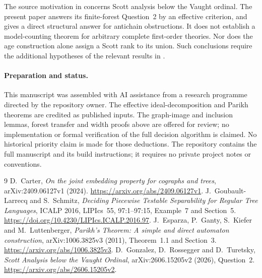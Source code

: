\documentclass[11pt]{article}
\begin{document}
The source motivation in \cite{GRT} concerns Scott analysis below the
Vaught ordinal. The present paper answers its finite-forest Question~2
by an effective criterion, and gives a direct structural answer for
antichain obstructions. It does not establish a model-counting theorem
for arbitrary complete first-order theories. Nor does the age
construction alone assign a Scott rank to its union. Such conclusions
require the additional hypotheses of the relevant results in
\cite{GRT}.

\paragraph{Preparation and status.}
This manuscript was assembled with AI assistance from a research
programme directed by the repository owner. The effective ideal-decomposition
and Parikh theorems are credited as published inputs. The graph-image and
inclusion lemmas, forest transfer and width proofs above are offered for
review; no implementation or formal verification of the full decision
algorithm is claimed. No historical priority
claim is made for those deductions. The repository contains the full
manuscript and its build instructions; it requires no private project
notes or conventions.

\begin{thebibliography}{9}
 D.~Carter, \emph{On the joint embedding property for
cographs and trees}, arXiv:2409.06127v1 (2024).
\url{https://arxiv.org/abs/2409.06127v1}.
 J.~Goubault-Larrecq and S.~Schmitz,
\emph{Deciding Piecewise Testable Separability for Regular Tree Languages},
ICALP 2016, LIPIcs~55, 97:1--97:15, Example~7 and Section~5.
\url{https://doi.org/10.4230/LIPIcs.ICALP.2016.97}.
 J.~Esparza, P.~Ganty, S.~Kiefer and M.~Luttenberger,
\emph{Parikh's Theorem: A simple and direct automaton construction},
arXiv:1006.3825v3 (2011), Theorem~1.1 and Section~3.
\url{https://arxiv.org/abs/1006.3825v3}.
 D.~Gonzalez, D.~Rossegger and D.~Turetsky,
\emph{Scott Analysis below the Vaught Ordinal}, arXiv:2606.15205v2
(2026), Question~2.
\url{https://arxiv.org/abs/2606.15205v2}.
\end{thebibliography}
\end{document}
